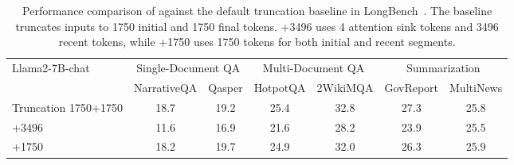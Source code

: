 \begin{table}
    \centering
    \small
    \setlength{\tabcolsep}{3pt}
    \caption{\small Performance comparison of \method against the default truncation baseline in LongBench~\citep{bai2023longbench}. The baseline truncates inputs to 1750 initial and 1750 final tokens. +3496 uses 4 attention sink tokens and 3496 recent tokens, while +1750 uses 1750 tokens for both initial and recent segments.}
    \label{tab:longbench}
    \begin{tabular}{lcccccc}
        \toprule
        \multirow{2}{*}{Llama2-7B-chat} & \multicolumn{2}{c}{Single-Document QA} & \multicolumn{2}{c}{Multi-Document QA} & \multicolumn{2}{c}{Summarization}                                    \\

                                        & NarrativeQA                            & Qasper                                & HotpotQA                          & 2WikiMQA & GovReport & MultiNews \\
        \midrule
        Truncation 1750+1750             & 18.7                                   & 19.2                                  & 25.4                              & 32.8     & 27.3      & 25.8      \\
        \midrule
        \method 4+3496                  & 11.6                                   & 16.9                                  & 21.6                              & 28.2     & 23.9      & 25.5      \\
        \method 1750+1750               & 18.2                                   & 19.7                                  & 24.9                              & 32.0     & 26.3      & 25.9      \\
        \bottomrule
    \end{tabular}
\end{table}
